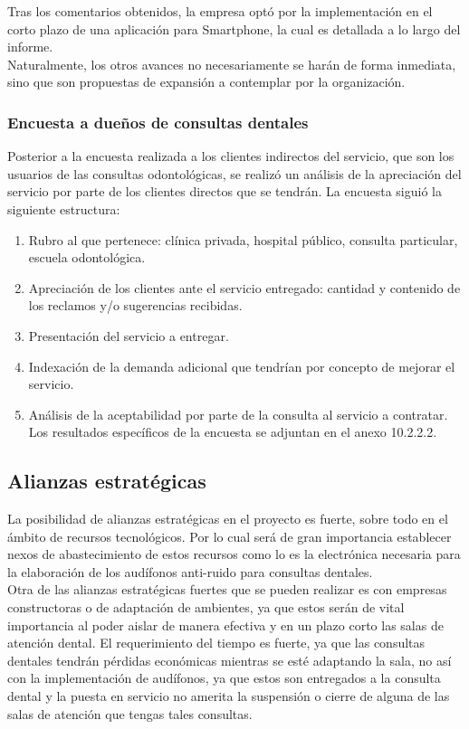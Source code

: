 \documentclass[letterpaper,12pt]{article}
\begin{document}
Tras los comentarios obtenidos, la empresa optó por la implementación en el corto plazo de
una aplicación para Smartphone, la cual es detallada a lo largo del informe. 
\\[0.5cm]
\indent Naturalmente, los otros avances no necesariamente se harán de forma inmediata, sino que 
son propuestas de expansión a contemplar por la organización.

		\subsubsection{Encuesta a dueños de consultas dentales}

Posterior a la encuesta realizada a los clientes indirectos del servicio, que son los usuarios de
las consultas odontológicas, se realizó un análisis de la apreciación del servicio por parte de los 
clientes directos que se tendrán. La encuesta siguió la siguiente estructura:
		\begin{enumerate}
			\setlength{\itemsep}{0pt}%
			\setlength{\parskip}{0pt}%
			\item Rubro al que pertenece: clínica privada, hospital público, consulta particular, escuela odontológica.
			\item Apreciación de los clientes ante el servicio entregado: cantidad y contenido de los reclamos y/o sugerencias recibidas.
			\item Presentación del servicio a entregar.
			\item Indexación de la demanda adicional que tendrían por concepto de mejorar el servicio.
			\item Análisis de la aceptabilidad por parte de la consulta al servicio a contratar. Los resultados específicos de la encuesta se adjuntan en el anexo 10.2.2.2.
		\end{enumerate}
	\subsection{Alianzas estratégicas}

La posibilidad de alianzas estratégicas en el proyecto es fuerte, sobre todo en el ámbito de
recursos tecnológicos. Por lo cual será de gran importancia establecer nexos de abastecimiento de 
estos recursos como lo es la electrónica necesaria para la elaboración de los audífonos anti-ruido 
para consultas dentales.
\\[0.5cm]
\indent Otra de las alianzas estratégicas fuertes que se pueden realizar es con empresas 
constructoras o de adaptación de ambientes, ya que estos serán de vital importancia al poder aislar 
de manera efectiva y en un plazo corto las salas de atención dental. El requerimiento del tiempo es 
fuerte, ya que las consultas dentales tendrán pérdidas económicas mientras se esté adaptando la 
sala, no así con la implementación de audífonos, ya que estos son entregados a la consulta dental y 
la puesta en servicio no amerita la suspensión o cierre de alguna de las salas de atención que 
tengas tales consultas.
\end{document}
